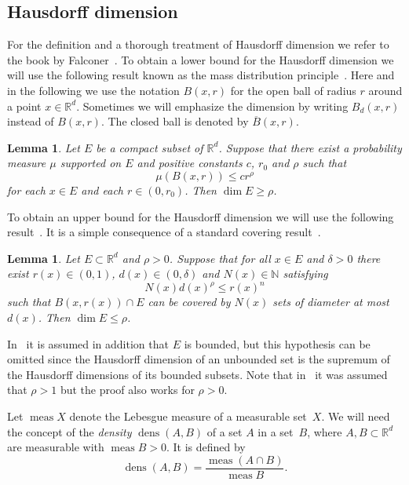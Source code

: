 \documentclass[12pt,a4paper]{amsart}
\theoremstyle{plain}
\newtheorem{lemma}[theorem]{Lemma}
\theoremstyle{definition}
\theoremstyle{remark}
\def\R{\mathbb R}
\def\N{\mathbb N}
\def\dens{\operatorname{dens}}
\def\meas{\operatorname{meas}}
\numberwithin{equation}{section}
\begin{document}
\subsection{Hausdorff dimension}  \label{h_dim} 
For the definition and a thorough treatment of Hausdorff dimension we refer 
to the book by Falconer~\cite{Falconer1990}.
To obtain a lower bound for  the Hausdorff dimension we will use the following
result known as the mass distribution principle~\cite[Proposition 4.9]{Falconer1990}.
Here and in the following we use the notation $B(x,r)$ for the open ball of
radius $r$ around a point $x\in\R^d$. Sometimes we will emphasize the dimension
by writing $B_d(x,r)$ instead of $B(x,r)$.
The closed ball is denoted by $\overline{B}(x,r)$.
\begin{lemma} \label{lemma-frostman}
Let $E$ be a compact subset of $\R^d$. Suppose that there exist a
probability measure $\mu$ supported on $E$ and positive constants
$c$, $r_0$ and $\rho$ such that
\begin{equation}\label{2c}
\mu(B(x,r))\leq cr^\rho
\end{equation}
for each $x\in E$ and each $r \in (0,r_0)$.
Then $\dim E\geq \rho$.
\end{lemma}

To obtain an upper bound for  the Hausdorff dimension we will use 
the following result~\cite[Lemma 5.2]{Bergweiler2010}. It is a simple 
consequence of a standard covering result~\cite[Covering Lemma~4.8]{Falconer1990}.
\begin{lemma} \label{lemma10}
Let $E\subset \R^d$ and $\rho>0$.
Suppose that for all $x\in E$ and $\delta >0$ there exist
$r(x)\in (0,1)$, $d(x)\in (0,\delta)$ and $N(x)\in \N$ satisfying
\begin{equation}\label{2d}
N(x)d(x)^\rho\leq r(x)^n
\end{equation}
 such that $B(x,r(x))\cap E$ can be
covered by $N(x)$ sets of diameter at most $d(x)$. Then
$\dim E\leq\rho$.
\end{lemma}
In~\cite{Bergweiler2010} it is assumed in addition that $E$ is bounded, 
but this hypothesis can be omitted since the Hausdorff dimension of an unbounded set
is the supremum of the Hausdorff dimensions of its bounded subsets. Note that in~\cite{Bergweiler2010} it was assumed that $\rho>1$ but the proof also works for $\rho>0$.

Let $\meas X$ denote the Lebesgue measure of a measurable set~$X$. We will need the concept of
the \emph{density} $\dens(A,B)$ of a set $A$ in a set~$B$,
where $A,B\subset \R^d$ are measurable with $\meas B>0$.  It is defined by
\begin{equation}\label{2a}
\dens(A,B)=\frac{\meas(A\cap B)}{\meas B}.
\end{equation}
\end{document}
